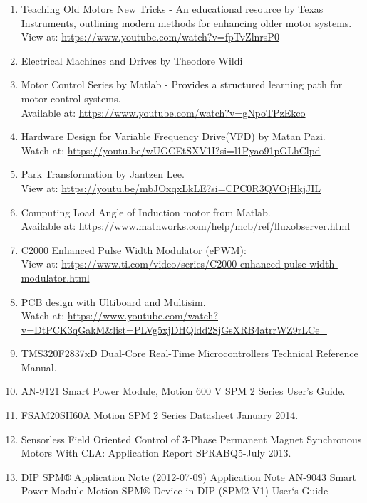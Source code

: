\begin{enumerate}
      \item Teaching Old Motors New Tricks - An educational resource by Texas Instruments, outlining modern methods for enhancing older motor systems.\\
            View at: \url{https://www.youtube.com/watch?v=fpTvZlnrsP0}

      \item Electrical Machines and Drives by Theodore Wildi

      \item Motor Control Series by Matlab - Provides a structured learning path for motor control systems.\\
            Available at: \url{https://www.youtube.com/watch?v=gNpoTPzEkco}

      \item Hardware Design for Variable Frequency Drive(VFD) by Matan Pazi.\\
            Watch at: \url{https://youtu.be/wUGCEtSXV1I?si=l1Pyao91pGLhClpd}

      \item Park Transformation by Jantzen Lee.\\
            View at: \url{https://youtu.be/mbJOxqxLkLE?si=CPC0R3QVOjHkjJIL}

      \item Computing Load Angle of Induction motor from Matlab.\\
            Available at: \url{https://www.mathworks.com/help/mcb/ref/fluxobserver.html}

      \item C2000 Enhanced Pulse Width Modulator (ePWM):\\
            View at: \url{https://www.ti.com/video/series/C2000-enhanced-pulse-width-modulator.html}

      \item PCB design with Ultiboard and Multisim.\\
            Watch at: \url{https://www.youtube.com/watch?v=DtPCK3qGakM&list=PLVg5xjDHQldd2SjGsXRB4atrrWZ9rLCe_}

      \item TMS320F2837xD Dual-Core Real-Time Microcontrollers Technical Reference Manual.
      
      \item AN-9121 Smart Power Module, Motion 600 V SPM 2 Series User's Guide.
      
      \item FSAM20SH60A Motion SPM 2 Series Datasheet January 2014.
      
      \item  Sensorless Field Oriented Control of 3-Phase Permanent Magnet Synchronous Motors With CLA: Application Report SPRABQ5-July 2013.

      \item DIP SPM® Application Note (2012-07-09) Application Note AN-9043 Smart Power Module Motion SPM® Device in DIP (SPM2 V1) User`s Guide
 
\end{enumerate}

